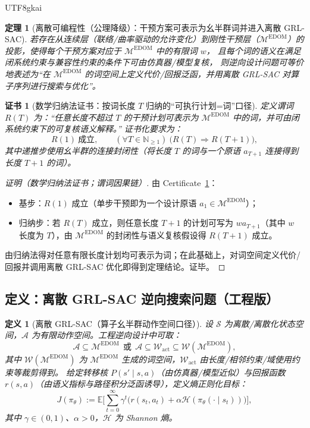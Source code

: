 \documentclass[12pt]{article}
\newtheorem{definition}{定义}[section]
\newtheorem{theorem}{定理}[section]
\newtheorem{certificate}{证书}[section]
\newcommand{\EDOM}{\ensuremath{\mathcal{M}^{\mathrm{EDOM}}}}
\begin{document}
\begin{CJK*}{UTF8}{gkai}
\begin{theorem}[离散可编程性（公理降级）：干预方案可表示为幺半群词并进入离散 GRL-SAC]
\label{thm:rigid-layer-discrete}
若存在从连续层（联络/曲率驱动的允许变化）到刚性干预层（\EDOM{}）的投影，使得每个干预方案对应于 \EDOM{} 中的有限词 $w$，
且每个词的语义在满足闭系统约束与兼容性约束的条件下可由仿真器/模型复核，
则逆向设计问题可等价地表述为“在 \EDOM{} 的词空间上定义代价/回报泛函，并用离散 GRL-SAC 对算子序列进行搜索与优化”。
\end{theorem}

\begin{certificate}[数学归纳法证书：按词长度 $T$ 归纳的“可执行计划=词”口径]
\label{cert:rigid-layer-word-induction}
定义谓词 $R(T)$ 为：“任意长度不超过 $T$ 的干预计划可表示为 \EDOM{} 中的词，并可由闭系统约束下的可复核语义解释。”
证书化要求为：
\[
R(1)\ \text{成立},\qquad
(\forall T\in\mathbb{N}_{\ge 1})\ \bigl(R(T)\Rightarrow R(T+1)\bigr),
\]
其中递推步使用幺半群的连接封闭性（将长度 $T$ 的词与一个原语 $a_{T+1}$ 连接得到长度 $T{+}1$ 的词）。
\end{certificate}

\begin{proof}[证明（数学归纳法证书；谓词因果链）]
由 Certificate~\ref{cert:rigid-layer-word-induction}：
\begin{itemize}
  \item 基步：$R(1)$ 成立（单步干预即为一个设计原语 $a_1\in\EDOM$）；
  \item 归纳步：若 $R(T)$ 成立，则任意长度 $T{+}1$ 的计划可写为 $w a_{T+1}$（其中 $w$ 长度为 $T$），由 \EDOM{} 的封闭性与语义复核假设得 $R(T{+}1)$ 成立。
\end{itemize}
由归纳法得对任意有限长度计划均可表示为词；在此基础上，对词空间定义代价/回报并调用离散 GRL-SAC 优化即得到定理结论。证毕。
\end{proof}

\subsection{定义：离散 GRL-SAC 逆向搜索问题（工程版）}

\begin{definition}[离散 GRL-SAC（算子幺半群动作空间口径）]
\label{def:grl-sac-engineering}
设 $\mathcal{S}$ 为离散/离散化状态空间，$\mathcal{A}$ 为有限动作空间。工程逆向设计中可取：
\[
\mathcal{A}\subseteq \EDOM\ \ \text{或}\ \ \mathcal{A}\subseteq \mathcal{W}_{\mathrm{act}}\subseteq \mathcal{W}(\EDOM),
\]
其中 $\mathcal{W}(\EDOM)$ 为 \EDOM{} 生成的词空间，$\mathcal{W}_{\mathrm{act}}$ 由长度/相邻约束/域使用约束等裁剪得到。
给定转移核 $P(s'\mid s,a)$（由仿真器/模型近似）与回报函数 $r(s,a)$（由语义指标与路径积分泛函诱导），定义熵正则化目标：
\[
  J(\pi_{\theta})
  :=
  \mathbb{E}\Biggl[
    \sum_{t=0}^{\infty}
    \gamma^{t} \bigl(
      r(s_{t},a_{t}) + \alpha \mathcal{H}(\pi_{\theta}(\cdot \mid s_{t}))
    \bigr)
  \Biggr],
\]
其中 $\gamma\in(0,1)$、$\alpha>0$，$\mathcal{H}$ 为 Shannon 熵。
\end{definition}


\end{CJK*}
\end{document}
